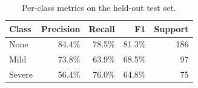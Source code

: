 \begin{table}[!t]
\centering
\caption{Per-class metrics on the held-out test set.}
\label{tab:classes}
\begin{tabular}{lrrrr}
\toprule
Class & Precision & Recall & F1 & Support \\
\midrule
None & 84.4\% & 78.5\% & 81.3\% & 186 \\
Mild & 73.8\% & 63.9\% & 68.5\% & 97 \\
Severe & 56.4\% & 76.0\% & 64.8\% & 75 \\
\bottomrule
\end{tabular}
\end{table}
